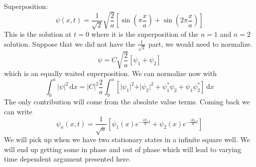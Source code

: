 \begin{remark}
    Superposition: 
\[
    \psi (x,t) = \frac{1}{\sqrt{2} } \sqrt{\frac{2}{a}} \left[ \sin (\pi \frac{x}{a}) + \sin (2\pi \frac{x}{a})\right] 
\]
This is the solution at \(t=0\) where it is the superposition of the \(n = 1\) and \(n = 2\) solution. Suppose that 
we did not have the \(\frac{1}{\sqrt{2} }\) part, we would need to normalize. 
\[
     \psi  = C \sqrt{\frac{2}{a}} \left[ \psi _1 + \psi _2 \right] 
\] 
which is an equally waited superposition. We can normalize now with 
\[
    \int_{0}^{a}  \vert \psi \vert ^{2} \,\mathrm{d}x = \vert C \vert  ^{2}  \frac{2}{a} \int_{0}^{a}  \left[ \vert \psi _1 \vert  ^{2}  + \vert \psi _2 \vert ^{2}  + \psi_1^* \psi _2 + \psi _1 \psi _2 ^*\right] \,\mathrm{d}x 
\]
The only contribution will come from the absolute value terms.   Coming back we can write 
\[
    \psi_n (x,t) = \frac{1}{\sqrt{a} } \left[ \psi _1 (x) e^{-\frac{iE_1}{\hbar }t} + \psi _2 (x) e^{-\frac{iE_2}{\hbar }t}   \right] 
\] 
We will pick up when we have two stationary states in a infinite square well. We will end up getting some in phase and out of 
phase which will lead to varying time dependent argument presented here. 
\end{remark}
